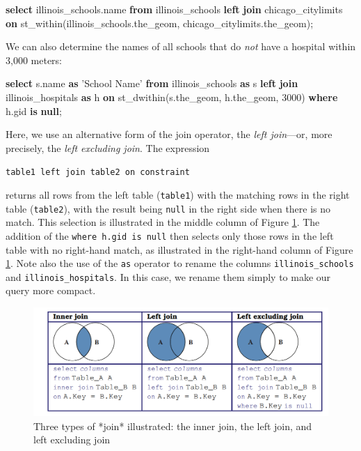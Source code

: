 \documentclass[]{krantz}
\newenvironment{Shaded}{\begin{snugshade}}{\end{snugshade}}
\newcommand{\KeywordTok}[1]{\textcolor[rgb]{0.13,0.29,0.53}{\textbf{#1}}}
\newcommand{\DecValTok}[1]{\textcolor[rgb]{0.00,0.00,0.81}{#1}}
\newcommand{\StringTok}[1]{\textcolor[rgb]{0.31,0.60,0.02}{#1}}
\newcommand{\NormalTok}[1]{#1}
\begin{document}
\begin{Shaded}
\begin{Highlighting}[]
\KeywordTok{select}\NormalTok{ illinois_schools.name}
  \KeywordTok{from}\NormalTok{ illinois_schools }\KeywordTok{left} \KeywordTok{join}\NormalTok{ chicago_citylimits}
  \KeywordTok{on}\NormalTok{ st_within(illinois_schools.the_geom,}
\NormalTok{                  chicago_citylimits.the_geom);}
\end{Highlighting}
\end{Shaded}

We can also determine the names of all schools that do \emph{not} have a
hospital within 3,000 meters:

\begin{Shaded}
\begin{Highlighting}[]
\KeywordTok{select}\NormalTok{ s.name }\KeywordTok{as} \StringTok{'School Name'}
    \KeywordTok{from}\NormalTok{ illinois_schools }\KeywordTok{as}\NormalTok{ s}
        \KeywordTok{left} \KeywordTok{join}\NormalTok{ illinois_hospitals }\KeywordTok{as}\NormalTok{ h}
          \KeywordTok{on}\NormalTok{ st_dwithin(s.the_geom, h.the_geom, }\DecValTok{3000}\NormalTok{)}
    \KeywordTok{where}\NormalTok{ h.gid }\KeywordTok{is} \KeywordTok{null}\NormalTok{;}
\end{Highlighting}
\end{Shaded}

Here, we use an alternative form of the join operator, the \emph{left
join}---or, more precisely, the \emph{left excluding join}. The
expression

\texttt{table1\ left\ join\ table2\ on\ constraint}

returns all rows from the left table (\texttt{table1}) with the matching
rows in the right table (\texttt{table2}), with the result being
\texttt{null} in the right side when there is no match. This selection
is illustrated in the middle column of Figure \ref{fig:fig-venn}. The
addition of the \texttt{where\ h.gid\ is\ null} then selects only those
rows in the left table with no right-hand match, as illustrated in the
right-hand column of Figure \ref{fig:fig-venn}. Note also the use of the
\texttt{as} operator to rename the columns \texttt{illinois\_schools}
and \texttt{illinois\_hospitals}. In this case, we rename them simply to
make our query more compact.

\begin{figure}

{\centering \includegraphics[width=0.7\linewidth]{ChapterDB/figures/fig-venn} 

}

\caption{Three types of *join* illustrated: the inner join, the left join, and left excluding join}\label{fig:fig-venn}
\end{figure}
\end{document}
